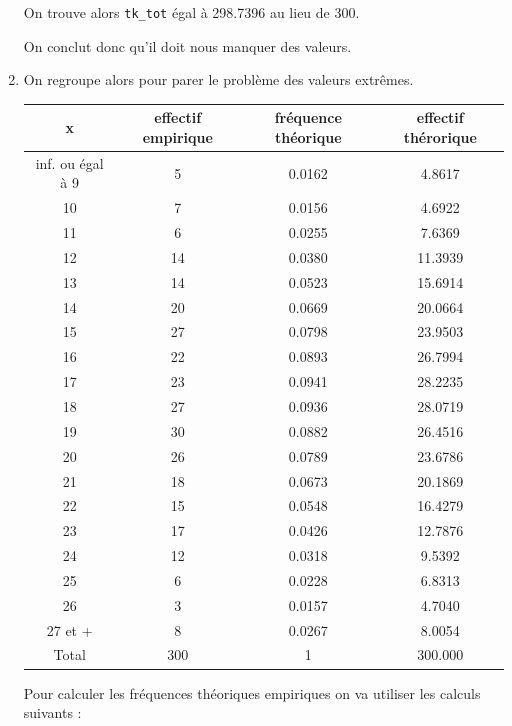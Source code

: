 \documentclass[a4paper,oneside]{article}
\begin{document}
\begin{enumerate}
On trouve alors \verb?tk_tot? égal à 298.7396 au lieu de 300.

On conclut donc qu'il doit nous manquer des valeurs.\\

\item

On regroupe alors pour parer le problème des valeurs extrêmes.


\begin{center}
\begin{tabular}{|c|c|c|c|}

 \hline
 x	& effectif empirique & fréquence théorique & effectif thérorique\\
 \hline
 inf. ou égal à 9 & 5	& 0.0162& 4.8617\\
 10 &	7	& 0.0156 & 4.6922\\
 11	& 	6	& 0.0255	&7.6369\\
 12	&	14	& 0.0380	&11.3939\\
 13	&	14  & 0.0523   &	15.6914\\
 14	&	20	& 0.0669 &	20.0664\\
 15	&	27  & 0.0798 &23.9503\\
 16	&	22	& 0.0893 &26.7994\\
 17	&	23  & 0.0941 &28.2235\\
 18	&	27	& 0.0936 &28.0719\\
 19	&	30  & 0.0882	 &26.4516\\
 20	&	26	& 0.0789 &23.6786\\
 21	&	18  & 0.0673	&20.1869\\
 22	&	15 &  0.0548	&16.4279\\
 23	&	17 & 0.0426	 &12.7876\\
 24	&	12 & 0.0318	&9.5392\\
 25	&	6  & 0.0228	&6.8313\\
 26 &	3 &	 0.0157 &4.7040\\
 27 et + &8	& 0.0267 &8.0054\\
\hline
 Total	&300	&1	&300.000\\

 \hline
\end{tabular}
 \end{center}

\newpage

Pour calculer les fréquences théoriques empiriques on va utiliser les calculs suivants :


\end{enumerate}
\end{document}
